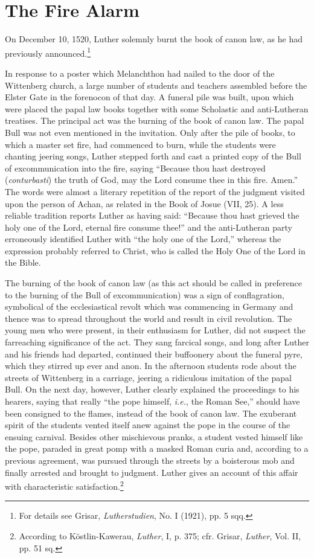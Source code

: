 \section{The Fire Alarm}

On December 10, 1520, Luther solemnly burnt the book of canon
law, as he had previously announced.\footnote
{For details see Grisar, \textit{Lutherstudien}, No. I (1921), pp. 5 sqq.}

In response to a poster which Melanchthon had nailed to the door
of the Wittenberg church, a large number of students and teachers
assembled before the Elster Gate in the forenocon of that day. A
funeral pile was built, upon which were placed the papal law books
together with some Scholastic and anti-Lutheran treatises. The principal
act was the burning of the book of canon law. The papal Bull
was not even mentioned in the invitation. Only after the pile of
books, to which a master set fire, had commenced to burn, while
the students were chanting jeering songs, Luther stepped forth and
cast a printed copy of the Bull of excommunication into the fire, saying
“Because thou hast destroyed (\textit{conturbasti}) the truth of God,
may the Lord consume thee in this fire. Amen.” The words were
almost a literary repetition of the report of the judgment visited upon
the person of Achan, as related in the Book of Josue (VII, 25). A
less reliable tradition reports Luther as having said: “Because thou
hast grieved the holy one of the Lord, eternal fire consume thee!”
and the anti-Lutheran party erroneously identified Luther with “the
holy one of the Lord,” whereas the expression probably referred to
Christ, who is called the Holy One of the Lord in the Bible.

The burning of the book of canon law (as this act should be called
in preference to the burning of the Bull of excommunication) was a
sign of conflagration, symbolical of the ecclesiastical revolt which
was commencing in Germany and thence was to spread throughout
the world and result in civil revolution. The young men who were
present, in their enthusiasm for Luther, did not suspect the farreaching
significance of the act. They sang farcical songs, and long
after Luther and his friends had departed, continued their buffoonery
about the funeral pyre, which they stirred up ever and anon. In the
afternoon students rode about the streets of Wittenberg in a carriage,
jeering a ridiculous imitation of the papal Bull. On the next day,
however, Luther clearly explained the proceedings to his hearers, saying
that really “the pope himself, \textit{i.e.}, the Roman See,” should have
been consigned to the flames, instead of the book of canon law. The
exuberant spirit of the students vented itself anew against the pope in
the course of the ensuing carnival. Besides other mischievous pranks, a
student vested himself like the pope, paraded in great pomp with a
masked Roman curia and, according to a previous agreement, was pursued
through the streets by a boisterous mob and finally arrested and
brought to judgment. Luther gives an account of this affair with
characteristic satisfaction.\footnote
{According to Köstlin-Kawerau, \textit{Luther}, I, p. 375; cfr. Grisar, \textit{Luther}, Vol. II, pp.
51 sq.}

